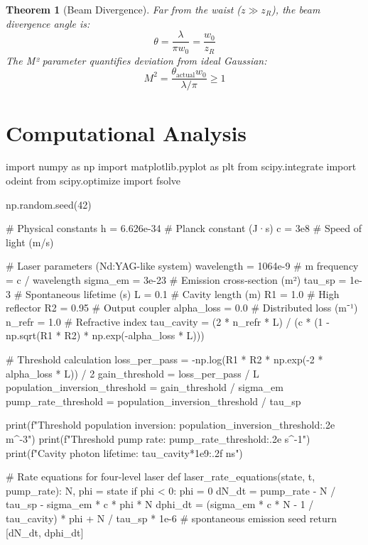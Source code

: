 \documentclass[a4paper, 11pt]{article}
\newtheorem{theorem}{Theorem}[section]
\begin{document}
\begin{theorem}[Beam Divergence]
Far from the waist ($z \gg z_R$), the beam divergence angle is:
\begin{equation}
\theta = \frac{\lambda}{\pi w_0} = \frac{w_0}{z_R}
\end{equation}
The M² parameter quantifies deviation from ideal Gaussian:
\begin{equation}
M^2 = \frac{\theta_{\text{actual}} w_0}{\lambda/\pi} \geq 1
\end{equation}
\end{theorem}

\section{Computational Analysis}

\begin{pycode}
import numpy as np
import matplotlib.pyplot as plt
from scipy.integrate import odeint
from scipy.optimize import fsolve

np.random.seed(42)

# Physical constants
h = 6.626e-34  # Planck constant (J·s)
c = 3e8  # Speed of light (m/s)

# Laser parameters (Nd:YAG-like system)
wavelength = 1064e-9  # m
frequency = c / wavelength
sigma_em = 3e-23  # Emission cross-section (m²)
tau_sp = 1e-3  # Spontaneous lifetime (s)
L = 0.1  # Cavity length (m)
R1 = 1.0  # High reflector
R2 = 0.95  # Output coupler
alpha_loss = 0.0  # Distributed loss (m⁻¹)
n_refr = 1.0  # Refractive index
tau_cavity = (2 * n_refr * L) / (c * (1 - np.sqrt(R1 * R2) * np.exp(-alpha_loss * L)))

# Threshold calculation
loss_per_pass = -np.log(R1 * R2 * np.exp(-2 * alpha_loss * L)) / 2
gain_threshold = loss_per_pass / L
population_inversion_threshold = gain_threshold / sigma_em
pump_rate_threshold = population_inversion_threshold / tau_sp

print(f"Threshold population inversion: {population_inversion_threshold:.2e} m^-3")
print(f"Threshold pump rate: {pump_rate_threshold:.2e} s^-1")
print(f"Cavity photon lifetime: {tau_cavity*1e9:.2f} ns")

# Rate equations for four-level laser
def laser_rate_equations(state, t, pump_rate):
    N, phi = state
    if phi < 0:
        phi = 0
    dN_dt = pump_rate - N / tau_sp - sigma_em * c * phi * N
    dphi_dt = (sigma_em * c * N - 1 / tau_cavity) * phi + N / tau_sp * 1e-6  # spontaneous emission seed
    return [dN_dt, dphi_dt]


\end{pycode}
\end{document}
